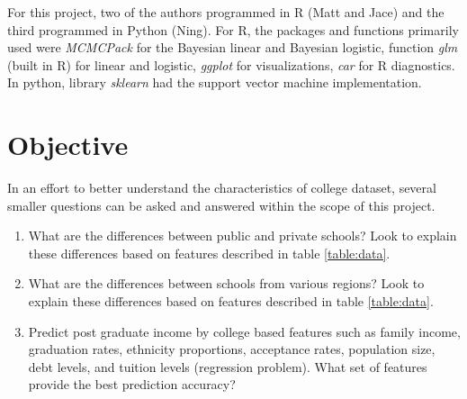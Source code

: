 \documentclass[10pt]{article}
\begin{document}
For this project, two of the authors programmed in R (Matt and Jace) and the third programmed in Python (Ning). For R, the packages and functions primarily used were \textit{MCMCPack} for the Bayesian linear and Bayesian logistic, function \textit{glm} (built in R) for linear and logistic, \textit{ggplot} for visualizations, \textit{car} for R diagnostics. In python, library \textit{sklearn} had the support vector machine implementation.

\section{Objective}

In an effort to better understand the characteristics of college dataset, several smaller questions can be asked and answered within the scope of this project.

 \begin{enumerate}
    \item What are the differences between public and private schools? Look to explain these differences based on features described in table \ref{table:data}.
    \item What are the differences between schools from various regions? Look to explain these differences based on features described in table \ref{table:data}.
    \item Predict post graduate income by college based features such as family income, graduation rates, ethnicity proportions, acceptance rates, population size, debt levels, and tuition levels (regression problem). What set of features provide the best prediction accuracy?
\end{enumerate}
\end{document}
